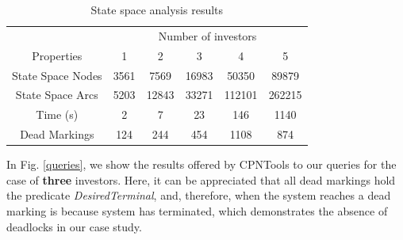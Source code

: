 \begin{table} [htp]
\centering
\footnotesize{
\begin{tabular}{|c|c|c|c|c|c|}
  \hline
     & \multicolumn{5}{c|}{Number of investors}\\\cline{2-6}%
  Properties     & 1 & 2 & 3 & 4 & 5 \\ \hline
  State Space Nodes & 3561  & 7569 & 16983 & 50350 & 89879 \\
  State Space Arcs & 5203 & 12843 & 33271  & 112101 &262215 \\
  Time (s) & 2 & 7 & 23 & 146 &  1140\\
  Dead Markings & 124 & 244  & 454  & 1108 &  874 \\
  \hline
\end{tabular}
}
\vspace{-0.2cm}
\caption{State space analysis results}
\label{state_space}
\end{table}
\vspace{-0.5cm}
In Fig. \ref{queries}, we show the results offered by CPNTools to
our queries for the case of {\bf three} investors. Here, it can be
appreciated that all dead markings hold the predicate {\em DesiredTerminal}, and, therefore, when the system reaches a dead marking is because system has terminated, which demonstrates the absence of deadlocks in our case study. 

